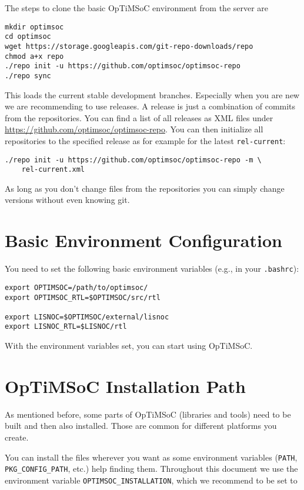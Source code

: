 The steps to clone the basic OpTiMSoC environment from the server are

\begin{lstlisting}
mkdir optimsoc
cd optimsoc
wget https://storage.googleapis.com/git-repo-downloads/repo
chmod a+x repo
./repo init -u https://github.com/optimsoc/optimsoc-repo
./repo sync
\end{lstlisting}

This loads the current stable development branches. Especially when
you are new we are recommending to use releases. A release is just a
combination of commits from the repositories. You can find a list of
all releases as XML files under
\url{https://github.com/optimsoc/optimsoc-repo}. You can then
initialize all repositories to the specified release as for example
for the latest \verb|rel-current|:

\begin{lstlisting}
./repo init -u https://github.com/optimsoc/optimsoc-repo -m \
    rel-current.xml
\end{lstlisting}

As long as you don't change files from the repositories you can simply
change versions without even knowing git.

\section{Basic Environment Configuration}


You need to set the following basic environment variables (e.g., in your
\verb|.bashrc|):

\begin{lstlisting}
export OPTIMSOC=/path/to/optimsoc/
export OPTIMSOC_RTL=$OPTIMSOC/src/rtl

export LISNOC=$OPTIMSOC/external/lisnoc
export LISNOC_RTL=$LISNOC/rtl
\end{lstlisting}

With the environment variables set, you can start using OpTiMSoC.

\section{OpTiMSoC Installation Path}

As mentioned before, some parts of OpTiMSoC (libraries and tools) need
to be built and then also installed. Those are common for different
platforms you create.

You can install the files wherever you want as some environment
variables (\verb|PATH|, \verb|PKG_CONFIG_PATH|, etc.) help finding
them. Throughout this document we use the environment variable
\verb|OPTIMSOC_INSTALLATION|, which we recommend to be set to

